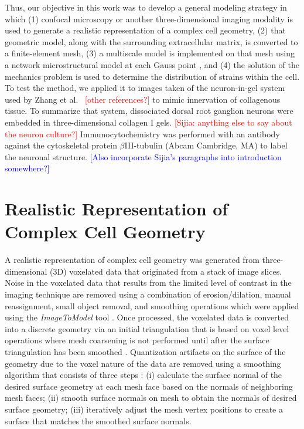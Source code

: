 \documentclass[]{interact}
\newcommand{\blue}[1]{\textcolor{blue}{[#1]}}
\newcommand{\red}[1]{\textcolor{red}{[#1]}}
\begin{document}
Thus, our objective in this work was to develop a general modeling strategy in which (1) confocal microscopy or another three-dimensional imaging modality is used to generate a realistic representation of a complex cell geometry, (2) that geometric model, along with the surrounding extracellular matrix, is converted to a finite-element mesh, (3) a multiscale model is implemented on that mesh using a network microstructural model at each Gauss point \citep{Chandran:2007hy,Stylianopoulos:2007dp}, and (4) the solution of the mechanics problem is used to determine the distribution of strains within the cell. To test the method, we applied it to images taken of the neuron-in-gel system used by Zhang et al.\ \citep{Zhang:2016ga} \red{other references?} to  mimic innervation of collagenous tissue. To summarize that system, dissociated dorsal root ganglion neurons were embedded in three-dimensional collagen I gels. \red{Sijia: anything else to say about the neuron culture?} Immunocytochemistry was performed with an antibody against the cytoskeletal protein $\beta$III-tubulin (Abcam Cambridge, MA) to label the neuronal structure. \blue{Also incorporate Sijia's paragraphs into introduction somewhere?}

\section{Realistic Representation of Complex Cell Geometry}

A realistic representation of complex cell geometry was generated from three-dimensional (3D) voxelated data that originated from a stack of image slices. Noise in the voxelated data that results from the limited level of contrast in the imaging technique are removed using a combination of erosion/dilation, manual reassignment, small object removal, and smoothing operations which were applied using the \textit{ImageToModel} tool \citep{Klaas:2013ug, Klaas_conference, simmetrix}. Once processed, the voxelated data is converted into a discrete geometry via an initial triangulation that is based on voxel level operations where mesh coarsening is not performed until after the surface triangulation has been smoothed \citep{Klaas:2013ug}. Quantization artifacts on the surface of the geometry due to the voxel nature of the data are removed using a smoothing algorithm that consists of three steps \citep{Klaas:2013ug}: (i) calculate the surface normal of the desired surface geometry at each mesh face based on the normals of neighboring mesh faces; (ii) smooth surface normals on mesh to obtain the normals of desired surface geometry; (iii) iteratively adjust the mesh vertex positions to create a surface that matches the smoothed surface normals.
\end{document}
